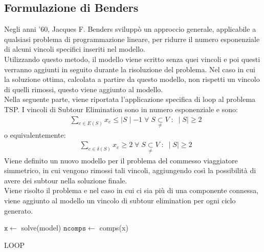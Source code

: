 \subsection{Formulazione di Benders}
Negli anni '60, Jacques F. Benders sviluppò un approccio generale, applicabile a qualsiasi problema di programmazione lineare, per ridurre il numero esponenziale di alcuni vincoli specifici inseriti nel modello.\\
Utilizzando questo metodo, il modello viene scritto senza quei vincoli e poi questi verranno aggiunti in seguito durante la risoluzione del problema. Nel caso in cui la soluzione ottima, calcolata a partire da questo modello, non rispetti un vincolo di quelli rimossi, questo viene aggiunto al modello. \\
Nella seguente parte, viene riportata l'applicazione specifica di loop al problema TSP.
I vincoli di Subtour Elimination sono in numero esponenziale e sono:\\
\begin{align}
&\underset{e\in E(S)}\sum{x_{e}} \leq \mid S\mid - 1\;\forall\;S\underset{\neq}{\subset}V\; : \; \mid S\mid\geq 2
\end{align}
o equivalentemente:
\begin{align}
&\underset{e\in \delta(S)}\sum{x_{e}}\geq 2\;\forall\;S\underset{\neq}{\subset}V\; : \; \mid S\mid\geq 2
\end{align}
Viene definito un nuovo modello per il problema del commesso viaggiatore simmetrico, in cui vengono rimossi tali vincoli, aggiungendo così la possibilità di avere dei subtour nella soluzione finale.\\
Viene risolto il problema e nel caso in cui ci sia più di una componente connessa, viene aggiunto al modello un vincolo di subtour elimination per ogni 
ciclo generato.\\
\begin{algorithm}[H]
\DontPrintSemicolon
{}
\BlankLine 
 $\mathtt{x} \gets$ solve(model)\;
 $\mathtt{ncomps} \gets$ comps(x)\;
 \BlankLine 
 \caption{LOOP}
\end{algorithm}

